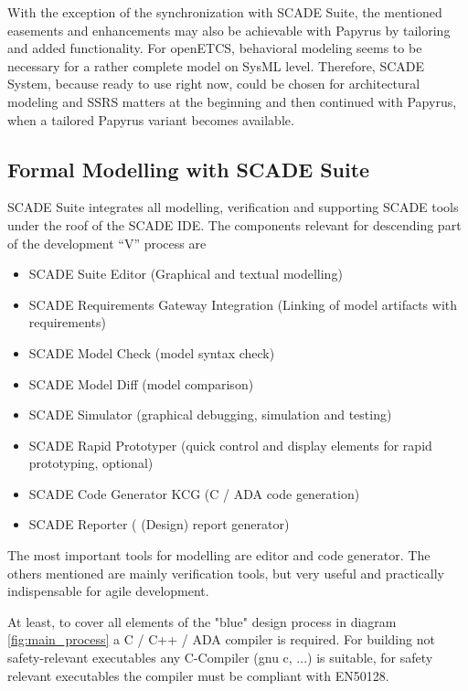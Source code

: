 With the exception of the synchronization with SCADE Suite, the mentioned easements and enhancements may also be achievable with Papyrus by tailoring and added functionality.
For openETCS, behavioral modeling seems to be necessary for a rather complete model on SysML level. 
Therefore, SCADE System, because ready to use right now, could be chosen for architectural modeling and SSRS matters at the beginning and then continued with Papyrus, when a tailored Papyrus variant becomes available.  

\subsection{Formal Modelling with SCADE Suite}
\label{sec:FormalModellingwithSCADESuite}

SCADE Suite integrates all modelling, verification and supporting SCADE tools under the roof of the SCADE IDE. The components relevant for descending part of the development "`V"' process are

\begin{itemize}
	\item SCADE Suite Editor (Graphical and textual modelling)
	\item SCADE Requirements Gateway Integration (Linking of model artifacts with requirements)
	\item SCADE Model Check (model syntax check)
	\item SCADE Model Diff (model comparison)
	\item SCADE Simulator (graphical debugging, simulation and testing) 
	\item SCADE Rapid Prototyper (quick control and display elements for rapid prototyping, optional)
	\item SCADE Code Generator KCG (C / ADA code generation)
	\item SCADE Reporter ( (Design) report generator)
\end{itemize}

The most important tools for modelling are editor and code generator. The others mentioned are mainly verification tools, but very useful and practically indispensable for agile development.

At least, to cover all elements of the "blue" design process in diagram \ref{fig:main_process} a C / C++ / ADA compiler is required. 
For building not safety-relevant executables any C-Compiler (gnu c, ...) is suitable, for safety relevant executables the compiler must be compliant with EN50128.   

